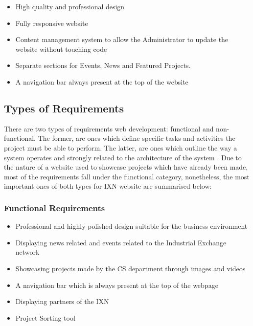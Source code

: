 \begin{itemize}
\tightlist
\item
  High quality and professional design
\item
  Fully responsive website
\item
  Content management system to allow the Administrator to update the
  website without touching code
\item
  Separate sections for Events, News and Featured Projects.
\item
  A navigation bar always present at the top of the website
\end{itemize}

\hypertarget{types-of-requirements}{%
\subsection{Types of Requirements}\label{types-of-requirements}}

There are two types of requirements web development: functional and
non-functional. The former, are ones which define specific tasks and
activities the project must be able to perform. The latter, are ones
which outline the way a system operates and strongly related to the
architecture of the system \cite{g5}. Due to the nature of a website
used to showcase projects which have already been made, most of the
requirements fall under the functional category, nonetheless, the most
important ones of both types for IXN website are summarised below:

\hypertarget{functional-requirements}{%
\subsubsection{Functional Requirements}\label{functional-requirements}}

\begin{itemize}
\tightlist
\item
  Professional and highly polished design suitable for the business
  environment
\item
  Displaying news related and events related to the Industrial Exchange
  network
\item
  Showcasing projects made by the CS department through images and
  videos
\item
  A navigation bar which is always present at the top of the webpage
\item
  Displaying partners of the IXN
\item
  Project Sorting tool
\end{itemize}

